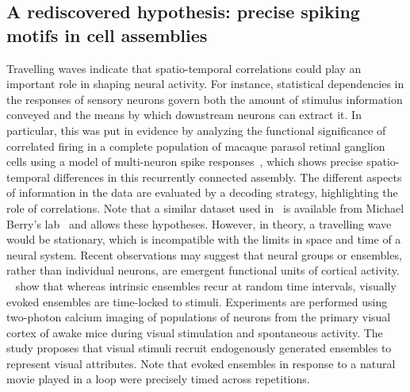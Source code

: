 \documentclass[brainsci, %
               review,submit,pdftex,moreauthors
               ]{Definitions/mdpi}
\begin{document}
\subsection{A rediscovered hypothesis: precise spiking motifs in cell assemblies}
Travelling waves indicate that spatio-temporal correlations could play an important role in shaping neural activity. For instance, statistical dependencies in the responses of sensory neurons govern both the amount of stimulus information conveyed and the means by which downstream neurons can extract it. In particular, this was put in evidence by analyzing the functional significance of correlated firing in a complete population of macaque parasol retinal ganglion cells using a model of multi-neuron spike responses~\citep{pillow_spatio-temporal_2008}, which shows precise spatio-temporal differences in this recurrently connected assembly. The different aspects of information in the data are evaluated by a decoding strategy, highlighting the role of correlations. Note that a similar dataset used in~\citep{schneidman_weak_2006} is available from Michael Berry's lab~\citep{berry_spike_2022} and allows  these hypotheses. However,  in theory, a  travelling wave would be stationary, which is incompatible with the limits in space and time of a neural system. Recent observations may suggest that neural groups or ensembles, rather than individual neurons, are emergent functional units of cortical activity. ~\citet{miller_visual_2014} show that whereas intrinsic ensembles recur at random time intervals, visually evoked ensembles are time-locked to stimuli. Experiments are performed using two-photon calcium imaging of populations of neurons from the primary visual cortex of awake mice during visual stimulation and spontaneous activity. The study proposes that visual stimuli recruit endogenously generated ensembles to represent visual attributes. Note that evoked ensembles in response to a natural movie played in a loop were precisely timed across repetitions. %
\end{document}
